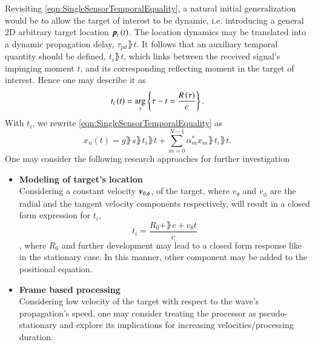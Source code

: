 Revisiting \eqref{eqn:SingleSensorTemporalEquality}, a natural initial generalization would be to allow the target of interest to be dynamic, i.e. introducing a general 2D arbitrary target location $\boldsymbol{p}_{t}\left({t}\right)$.
The location dynamics may be translated into a dynamic propagation delay, $\tau_{pd}\rBrace{t}$.
It follows that an auxiliary temporal quantity should be defined, $t_{i}\rBrace{t}$, which links between the received signal's impinging moment $t$, and its corresponding reflecting moment in the target of interest.
Hence one may describe it as
\begin{equation}
    t_{i}\left({t}\right)=\underset{\tau}{\mathrm{arg}}\left\{{\tau-t=\frac{R\left({\tau}\right)}{c}}\right\}.
\end{equation}
With $t_{i}$, we rewrite \eqref{eqn:SingleSensorTemporalEquality} as
\begin{equation}
    \label{eqn:ftr_dyn_temp}
    x_{n}(t) = g\rBrace{s\rBrace{t_{i}\rBrace{t}}
    +\sum_{m=0}^{N-1}{\alpha^{*}_{m}x_{m}\rBrace{t_{i}\rBrace{t}}}}.
\end{equation}
One may consider the following research approaches for further investigation
\begin{itemize}
    \item \textbf{Modeling of target's location}
    \\Considering a constant velocity $\boldsymbol{v}_{\theta,\phi}$, of the target, where $v_{\theta}$ and $v_{\phi}$ are the radial and the tangent velocity components respectively, will result in a closed form expression for $t_{i}$, $$t_{i}=\frac{R_{0}+\rBrace{c+v_{\theta}}t}{c}$$, where $R_{0}$ and further development may lead to a closed form response like in the stationary case.
    In this manner, other component may be added to the positional equation.
    \item \textbf{Frame based processing}
    \\Considering low velocity of the target with respect to the wave's propagation's speed, one may consider treating the processor as pseudo-stationary and explore its implications for increasing velocities/processing duration. 
\end{itemize}
